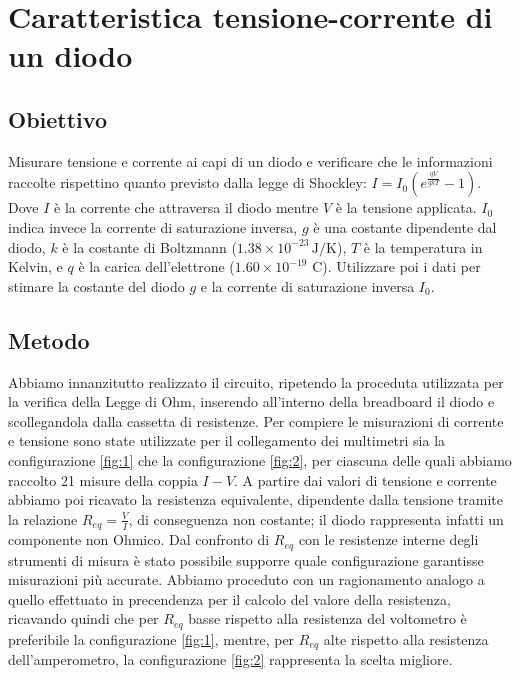 \documentclass[a4paper]{article}
\begin{document}
\section{Caratteristica tensione-corrente di un diodo}
\subsection{Obiettivo}
Misurare tensione e corrente ai capi di un diodo e verificare che le informazioni raccolte rispettino quanto previsto dalla legge di Shockley: \(I = I_0 \left( e^{\frac{qV}{gkT}} - 1 \right)\).
Dove \( I \) è la corrente che attraversa il diodo mentre \( V \) è la tensione applicata. \( I_0 \) indica invece la corrente di saturazione inversa, \( g \) è una costante dipendente dal diodo,
\( k \) è la costante di Boltzmann (\( 1.38 \times 10^{-23} \, \text{J/K} \)), \( T \) è la temperatura in Kelvin, e \( q \) è la carica dell'elettrone (\( 1.60 \times 10^{-19} \) C).
Utilizzare poi i dati per stimare la costante del diodo \( g \) e la corrente di saturazione inversa \( I_0 \).
\subsection{Metodo}
Abbiamo innanzitutto realizzato il circuito, ripetendo la proceduta utilizzata per la verifica della Legge di Ohm, inserendo all'interno della breadboard il diodo e scollegandola dalla cassetta di resistenze.
Per compiere le misurazioni di corrente e tensione sono state utilizzate per il collegamento dei multimetri sia la configurazione \ref{fig:1} che la configurazione \ref{fig:2},
per ciascuna delle quali abbiamo raccolto 21 misure della coppia \( I-V \). A partire dai valori di tensione e corrente abbiamo poi ricavato la resistenza equivalente,
dipendente dalla tensione tramite la relazione \( R_{eq} = \frac {V}{I} \), di conseguenza non costante; il diodo rappresenta infatti un componente non Ohmico.
Dal confronto di \(R_{eq}\) con le resistenze interne degli strumenti di misura è stato possibile supporre quale configurazione garantisse misurazioni più accurate.
Abbiamo proceduto con un ragionamento analogo a quello effettuato in precendenza per il calcolo del valore della resistenza, ricavando quindi che per \(R_{eq}\) basse rispetto alla resistenza del voltometro è preferibile la configurazione \ref{fig:1}, mentre, per \(R_{eq}\) alte rispetto alla resistenza dell'amperometro, la configurazione \ref{fig:2} rappresenta la scelta migliore.
\end{document}

